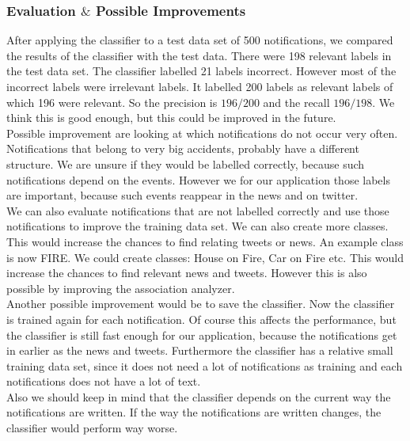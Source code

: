 \subsubsection*{Evaluation $\&$ Possible Improvements }
After applying the classifier to a test data set of 500 notifications, we compared the results of the classifier with the test data. 
There were 198 relevant labels in the test data set. The classifier labelled 21 labels incorrect. 
However most of the incorrect labels were irrelevant labels. 
It labelled 200 labels as relevant labels of which 196 were relevant. 
So the precision is $196/200$ and the recall $196/198$. 
We think this is good enough, but this could be improved in the future. \\
Possible improvement are looking at which notifications do not occur very often. 
Notifications that belong to very big accidents, probably have a different structure. 
We are unsure if they would be labelled correctly, because such notifications depend on the events. 
However we for our application those labels are important, because such events reappear in the news and on twitter. \\
We can also evaluate notifications that are not labelled correctly and use those notifications to improve the training data set. 
We can also create more classes. This would increase the chances to find relating tweets or news. An example class is now FIRE.
 We could create classes: House on Fire, Car on Fire etc. This would increase the chances to find relevant news and tweets. However this is also possible by improving the association analyzer. \\
 Another possible improvement would be to save the classifier. Now the classifier is trained again for each notification. 
 Of course this affects the performance, but the classifier is still fast enough for our application, because the notifications get in earlier as the news and tweets. 
 Furthermore the classifier has a relative small training data set, since it does not need a lot of notifications as training and each notifications does not have a lot of text.\\
Also we should keep in mind that the classifier depends on the current way the notifications are written. 
If the way the notifications are written changes, the classifier would perform way worse.
